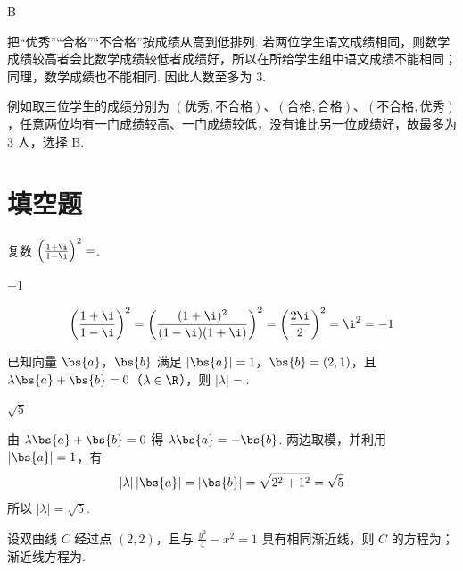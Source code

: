 \begin{answer}
B
\end{answer}

\begin{solution}
把“优秀”“合格”“不合格”按成绩从高到低排列. 若两位学生语文成绩相同，则数学成绩较高者会比数学成绩较低者成绩好，所以在所给学生组中语文成绩不能相同；同理，数学成绩也不能相同. 因此人数至多为 \(3\).

例如取三位学生的成绩分别为 \((\text{优秀},\text{不合格})\)、\((\text{合格},\text{合格})\)、\((\text{不合格},\text{优秀})\)，任意两位均有一门成绩较高、一门成绩较低，没有谁比另一位成绩好，故最多为 \(3\) 人，选择 B.
\end{solution}

\section{填空题}

\begin{problem}
复数 \(\left(\frac{1 + \i}{1 - \i}\right)^2 =\)\fillinblank{}.
\end{problem}

\begin{answer}
\(-1\)
\end{answer}

\begin{solution}
\[
\left(\frac{1+\i}{1-\i}\right)^{2}
=\left(\frac{(1+\i)^{2}}{(1-\i)(1+\i)}\right)^{2}
=\left(\frac{2\i}{2}\right)^{2}
=\i^{2}=-1
\]
\end{solution}

\begin{problem}
已知向量 \(\bs{a}\)，\(\bs{b}\) 满足 \(|\bs{a}| = 1\)，\(\bs{b} = (2, 1)\)，且 \(\lambda \bs{a} + \bs{b} = 0\)（\(\lambda \in \R\)），则 \(|\lambda| = \)\fillinblank{}.
\end{problem}

\begin{answer}
\(\sqrt{5}\)
\end{answer}

\begin{solution}
由 \(\lambda\bs{a}+\bs{b}=0\) 得 \(\lambda\bs{a}=-\bs{b}\). 两边取模，并利用 \(|\bs{a}|=1\)，有
\[
|\lambda|\,|\bs{a}|=|\bs{b}|=\sqrt{2^{2}+1^{2}}=\sqrt5
\]
所以 \(|\lambda|=\sqrt5\).
\end{solution}

\begin{problem}
设双曲线 \(C\) 经过点 \((2,2)\)，且与 \(\frac{y^{2}}{4}-x^{2}=1\) 具有相同渐近线，则 \(C\) 的方程为\fillinblank{}；渐近线方程为\fillinblank{}.
\end{problem}

